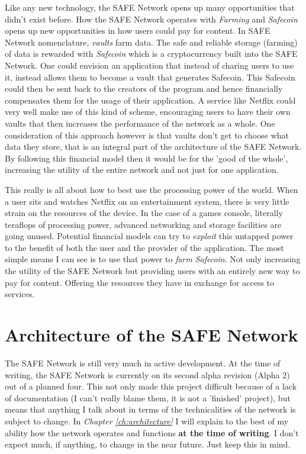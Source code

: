 \documentclass{l4proj}
\begin{document}
Like any new technology, the SAFE Network opens up many opportunities that didn't exist before. How the SAFE Network operates with \textit{Farming} and \textit{Safecoin} opens up new opportunities in how users could pay for content. In SAFE Network nomenclature, \textit{vaults} farm data. The safe and reliable storage (farming) of data is rewarded with \textit{Safecoin} which is a cryptocurrency built into the SAFE Network. One could envision an application that instead of charing users to use it, instead allows them to become a vault that generates Safecoin. This Safecoin could then be sent back to the creators of the program and hence financially compensates them for the usage of their application. A service like Netflix could very well make use of this kind of scheme, encouraging users to have their own vaults that then increases the performance of the network as a whole. One consideration of this approach however is that vaults don't get to choose what data they store, that is an integral part of the architecture of the SAFE Network. By following this financial model then it would be for the 'good of the whole', increasing the utility of the entire network and not just for one application.

This really is all about how to best use the processing power of the world. When a user sits and watches Netflix on an entertainment system, there is very little strain on the resources of the device. In the case of a games console, literally teraflops of processing power, advanced networking and storage facilities are going unused. Potential financial models can try to \textit{exploit} this untapped power to the benefit of both the user and the provider of the application. The most simple means I can see is to use that power to \textit{farm} \textit{Safecoin}. Not only increasing the utility of the SAFE Network but providing users with an entirely new way to pay for content. Offering the resources they have in exchange for access to services.

\section{Architecture of the SAFE Network}

The SAFE Network is still very much in active development. At the time of writing, the SAFE Network is currently on its second alpha revision (Alpha 2) out of a planned four. This not only made this project difficult because of a lack of documentation (I can't really blame them, it is not a 'finished' project), but means that anything I talk about in terms of the technicalities of the network is subject to change. In \textit{Chapter \ref{ch:architecture}} I will explain to the best of my ability how the network operates and functions \textbf{at the time of writing}. I don't expect much, if anything, to change in the near future. Just keep this in mind.
\end{document}
